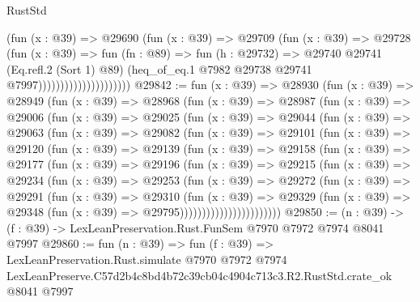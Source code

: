 \begin{lexlean}{RustStd}
\begin{coremodule}
                                    (fun (x : @39) =>
                                    @29690
                                      (fun (x : @39) =>
                                      @29709
                                        (fun (x : @39) =>
                                        @29728
                                          (fun (x : @39) =>
                                          fun (fn : @89) =>
                                          fun (h : @29732) =>
                                          @29740
                                            @29741
                                            (Eq.refl.{2} (Sort 1) @89)
                                            (heq_of_eq.{1}
                                              @7982
                                              @29738
                                              @29741
                                              @7997)))))))))))))))))))))
@29842 := fun (x : @39) =>
  @28930
    (fun (x : @39) =>
    @28949
      (fun (x : @39) =>
      @28968
        (fun (x : @39) =>
        @28987
          (fun (x : @39) =>
          @29006
            (fun (x : @39) =>
            @29025
              (fun (x : @39) =>
              @29044
                (fun (x : @39) =>
                @29063
                  (fun (x : @39) =>
                  @29082
                    (fun (x : @39) =>
                    @29101
                      (fun (x : @39) =>
                      @29120
                        (fun (x : @39) =>
                        @29139
                          (fun (x : @39) =>
                          @29158
                            (fun (x : @39) =>
                            @29177
                              (fun (x : @39) =>
                              @29196
                                (fun (x : @39) =>
                                @29215
                                  (fun (x : @39) =>
                                  @29234
                                    (fun (x : @39) =>
                                    @29253
                                      (fun (x : @39) =>
                                      @29272
                                        (fun (x : @39) =>
                                        @29291
                                          (fun (x : @39) =>
                                          @29310
                                            (fun (x : @39) =>
                                            @29329
                                              (fun (x : @39) =>
                                              @29348 (fun (x : @39) => @29795)))))))))))))))))))))))
@29850 := (n : @39) -> (f : @39) -> LexLeanPreservation.Rust.FunSem @7970 @7972 @7974 @8041 @7997
@29860 := fun (n : @39) =>
  fun (f : @39) =>
  LexLeanPreservation.Rust.simulate
    @7970
    @7972
    @7974
    LexLeanPreserve.C57d2b4c8bd4b72c39cb04c4904c713c3.R2.RustStd.crate_ok
    @8041
    @7997
\end{coremodule}
\end{lexlean}
